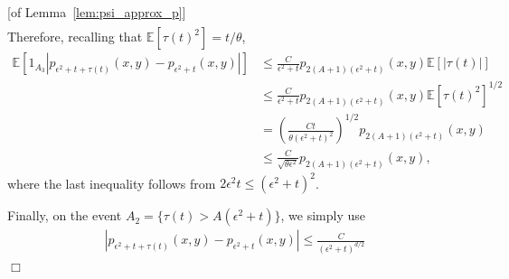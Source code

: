 \documentclass[12pt]{article}
\newenvironment {proof}{{\noindent\bf Proof }}{\hfill $\Box$ \medskip}
\newcommand{\IE}{\mathbb E}
\begin{document}
\begin{proof}[of Lemma~\ref{lem:psi_approx_p}]
\begin{align*}
    \end{align*}
    Therefore, recalling that $\IE[\tau(t)^2] = t / \theta$,
    \begin{align*}
        \IE\left[
            1_{A_3}
            \left|
                p_{\epsilon^2 + t + \tau(t)}(x, y)
                -
                p_{\epsilon^2 + t}(x, y)
            \right|
        \right]
        &\le
            \frac{C}{\epsilon^2 + t}
                p_{2(A + 1)(\epsilon^2 + t)}(x, y)
            \IE\left[|\tau(t)|\right]
        \\ &\le
            \frac{C}{\epsilon^2 + t}
                p_{2(A + 1)(\epsilon^2 + t)}(x, y)
            \IE\left[\tau(t)^2\right]^{1/2}
        \\ &=
            \left( \frac{Ct}{\theta(\epsilon^2 + t)^2} \right)^{1/2}
                p_{2(A + 1)(\epsilon^2 + t)}(x, y)
        \\ &\le
            \frac{C}{\sqrt{\theta \epsilon^2}}
                p_{2(A + 1)(\epsilon^2 + t)}(x, y) ,
    \end{align*}
    where the last inequality follows from $2 \epsilon^2 t \le (\epsilon^2 + t)^2$.

    Finally, on the event $A_2 = \{\tau(t) > A(\epsilon^2 + t)\}$,
    we simply use
    \begin{align*}
        \left|
            p_{\epsilon^2 + t + \tau(t)}(x, y)
            -
            p_{\epsilon^2 + t}(x, y)
        \right|
        \le
        \frac{C}{(\epsilon^2 + t)^{d/2}}
    \end{align*}
\end{proof}
\end{document}
